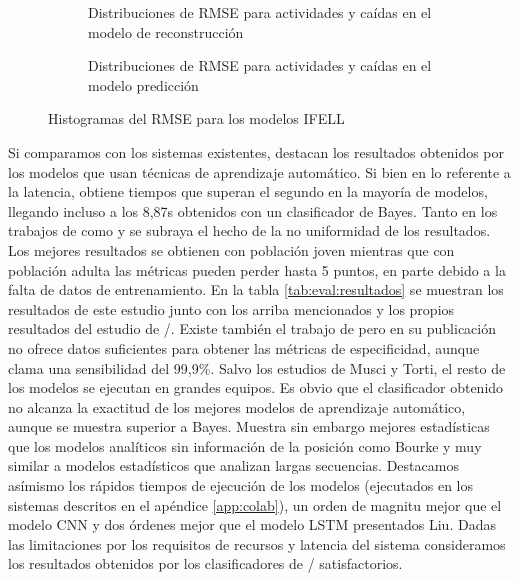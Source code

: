 \begin{figure}[!ht]
  \centering
  \begin{subfigure}[b]{0.45\textwidth}
      \centering
      \caption{\footnotesize \label{fig:ifell:adata:rmshist:recon}Distribuciones de RMSE para actividades y caídas en el modelo de reconstrucción}
  \end{subfigure}
  \hfill
  \begin{subfigure}[b]{0.45\textwidth}
      \centering
      \caption{\footnotesize \label{fig:ifell:adata:rmshist:pred}Distribuciones de RMSE para actividades y caídas en el modelo predicción}
  \end{subfigure}
  \caption{\label{fig:ifell:adata:rmshist}Histogramas del RMSE para los modelos IFELL}
\end{figure}

Si comparamos con los sistemas existentes, destacan los resultados obtenidos por los modelos que usan técnicas de aprendizaje automático. Si bien en lo referente a la latencia, \cite{Liu2020} obtiene tiempos que superan el segundo en la mayoría de modelos, llegando incluso a los 8,87s obtenidos con un clasificador de Bayes. Tanto en los trabajos de \cite{Liu2018, Liu2020} como \cite{Musci2020} y \cite{Torti2018} se subraya el hecho de la no uniformidad de los resultados. Los mejores resultados se obtienen con población joven mientras que con población adulta las métricas pueden perder hasta 5 puntos, en parte debido a la falta de datos de entrenamiento. En la tabla \ref{tab:eval:resultados} se muestran los resultados de este estudio junto con los arriba mencionados y los propios resultados del estudio de \sisfall/\cite{Sucerquia2017}. Existe también el trabajo de  pero en su publicación no ofrece datos suficientes para obtener las métricas de especificidad, aunque clama una sensibilidad del 99,9\%. Salvo los estudios de Musci y Torti, el resto de los modelos se ejecutan en grandes equipos. Es obvio que el clasificador obtenido no alcanza la exactitud de los mejores modelos de aprendizaje automático, aunque se muestra superior a Bayes. Muestra sin embargo mejores estadísticas que los modelos analíticos sin información de la posición como Bourke y muy similar a modelos estadísticos que analizan largas secuencias. Destacamos asímismo los rápidos tiempos de ejecución de los modelos (ejecutados en los sistemas descritos en el apéndice \ref{app:colab}), un orden de magnitu mejor que el modelo CNN y dos órdenes mejor que el modelo LSTM presentados Liu. Dadas las limitaciones por los requisitos de recursos y latencia del sistema consideramos los resultados obtenidos por los clasificadores de \ifell/ satisfactorios.

